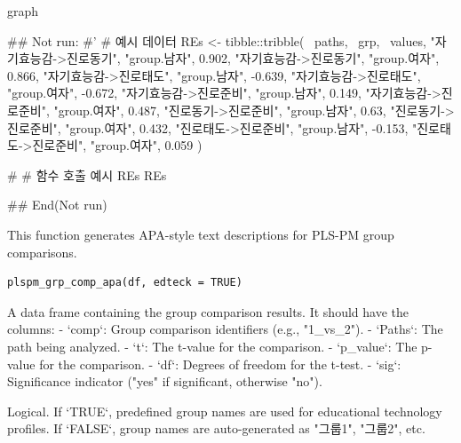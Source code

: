 \documentclass[a4paper]{book}
\begin{document}
%
\begin{Value}
graph
\end{Value}
%
\begin{Examples}
\begin{ExampleCode}

## Not run: 
#'
# 예시 데이터
REs <- tibble::tribble(
  ~paths, ~grp, ~values,
  "자기효능감->진로동기", "group.남자", 0.902,
  "자기효능감->진로동기", "group.여자", 0.866,
  "자기효능감->진로태도", "group.남자", -0.639,
  "자기효능감->진로태도", "group.여자", -0.672,
  "자기효능감->진로준비", "group.남자", 0.149,
  "자기효능감->진로준비", "group.여자", 0.487,
  "진로동기->진로준비", "group.남자", 0.63,
  "진로동기->진로준비", "group.여자", 0.432,
  "진로태도->진로준비", "group.남자", -0.153,
  "진로태도->진로준비", "group.여자", 0.059
)

# # 함수 호출 예시
REs %
REs %

## End(Not run)
\end{ExampleCode}
\end{Examples}
%
\begin{Description}
This function generates APA-style text descriptions for PLS-PM group comparisons.
\end{Description}
%
\begin{Usage}
\begin{verbatim}
plspm_grp_comp_apa(df, edteck = TRUE)
\end{verbatim}
\end{Usage}
%
\begin{Arguments}
\begin{ldescription}
\item[\code{df}] A data frame containing the group comparison results. It should have the columns:
- `comp`: Group comparison identifiers (e.g., "1\_vs\_2").
- `Paths`: The path being analyzed.
- `t`: The t-value for the comparison.
- `p\_value`: The p-value for the comparison.
- `df`: Degrees of freedom for the t-test.
- `sig`: Significance indicator ("yes" if significant, otherwise "no").

\item[\code{edteck}] Logical. If `TRUE`, predefined group names are used for educational technology profiles.
If `FALSE`, group names are auto-generated as "그룹1", "그룹2", etc.
\end{ldescription}
\end{Arguments}
\end{document}
